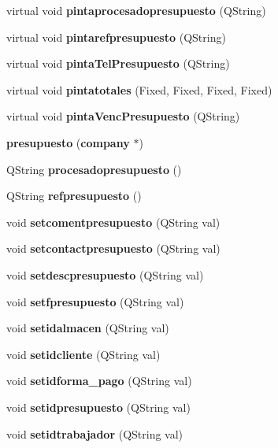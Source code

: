 \begin{CompactItemize}
\item 
virtual void {\bf pintaprocesadopresupuesto} (QString)\label{classpresupuesto_a32}

\item 
virtual void {\bf pintarefpresupuesto} (QString)\label{classpresupuesto_a33}

\item 
virtual void {\bf pinta\-Tel\-Presupuesto} (QString)\label{classpresupuesto_a34}

\item 
virtual void {\bf pintatotales} (Fixed, Fixed, Fixed, Fixed)\label{classpresupuesto_a35}

\item 
virtual void {\bf pinta\-Venc\-Presupuesto} (QString)\label{classpresupuesto_a36}

\item 
{\bf presupuesto} ({\bf company} $\ast$)\label{classpresupuesto_a37}

\item 
QString {\bf procesadopresupuesto} ()\label{classpresupuesto_a38}

\item 
QString {\bf refpresupuesto} ()\label{classpresupuesto_a39}

\item 
void {\bf setcomentpresupuesto} (QString val)\label{classpresupuesto_a40}

\item 
void {\bf setcontactpresupuesto} (QString val)\label{classpresupuesto_a41}

\item 
void {\bf setdescpresupuesto} (QString val)\label{classpresupuesto_a42}

\item 
void {\bf setfpresupuesto} (QString val)\label{classpresupuesto_a43}

\item 
void {\bf setidalmacen} (QString val)\label{classpresupuesto_a44}

\item 
void {\bf setidcliente} (QString val)\label{classpresupuesto_a45}

\item 
void {\bf setidforma\_\-pago} (QString val)\label{classpresupuesto_a46}

\item 
void {\bf setidpresupuesto} (QString val)\label{classpresupuesto_a47}

\item 
void {\bf setidtrabajador} (QString val)\label{classpresupuesto_a48}


\end{CompactItemize}
